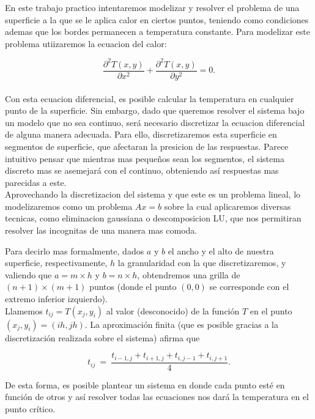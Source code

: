 En este trabajo practico intentaremos modelizar y resolver el problema de una superficie a la que se le aplica calor en ciertos puntos, teniendo como condiciones ademas que los bordes permanecen a temperatura constante. Para modelizar este problema utiizaremos la ecuacion del calor:

\begin{equation}
\frac{\partial^2T(x,y)}{\partial x^{2}}+\frac{\partial^2 T(x,y)}{\partial y^{2}} = 0.
\end{equation}\\

Con esta ecuacion diferencial, es posible calcular la temperatura en cualquier punto de la superficie. Sin embargo, dado que queremos resolver el sistema bajo un modelo que no sea continuo, ser\'a necesario discretizar la ecuacion diferencial de alguna manera adecuada. Para ello, discretizaremos esta superficie en segmentos de superficie, que afectaran la presicion de las respuestas. Parece intuitivo pensar que mientras mas pequeños sean los segmentos, el sistema discreto mas se asemejar\'a con el continuo, obteniendo as\'i respuestas mas parecidas a este.\\

Aprovechando la discretizacion del sistema y que este es un problema lineal, lo modelizaremos como un problema $Ax=b$ sobre la cual aplicaremos diversas tecnicas, como eliminacion gaussiana o descomposicion LU, que nos permitiran resolver las incognitas de una manera mas comoda.

Para decirlo mas formalmente, dados $a$ y $b$ el ancho y el alto de nuestra superficie, respectivamente, $h$ la granularidad con la que discretizaremos, y valiendo que  $a = m\times h$ y $b = n \times h$, obtendremos una grilla de $(n+1)\times(m+1)$ puntos (donde el punto $(0,0)$ se corresponde con el extremo inferior izquierdo).\\

Llamemos $t_{ij} = T(x_j,y_i)$ al valor (desconocido) de la funci\'on $T$ en el punto $(x_j, y_i) = (ih, jh)$. La aproximaci\'on finita (que es posible gracias a la discretizaci\'on realizada sobre el sistema) afirma que

\begin{equation}
t_{ij} \ =\ \frac{ t_{i-1,j} + t_{i+1,j} + t_{i,j-1} + t_{i,j+1}}{4}.
\end{equation}

De esta forma, es posible plantear un sistema en donde cada punto est\'e en funci\'on de otros y as\'i resolver todas las ecuaciones nos dar\'a la temperatura en el punto cr\'itico.
